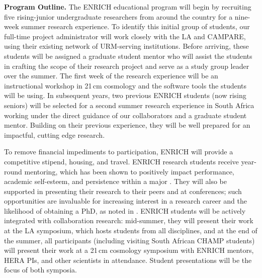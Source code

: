 \documentclass[preprint,11pt]{aastex}
\begin{document}
\textbf{Program Outline.} The ENRICH educational program will begin by recruiting five rising-junior undergraduate researchers from around the country for a nine-week summer research experience.  To identify this initial group of students, our full-time project administrator will work closely with the LA and CAMPARE, using their existing network of URM-serving institutions.  Before arriving, these students will be assigned a graduate student mentor who will assist the students in crafting the scope of their research project and serve as a study group leader over the summer.  The first week of the research experience will be an instructional workshop in 21\,cm cosmology and the software tools the students will be using.  In subsequent years, two previous ENRICH students (now rising seniors) will be selected for a second summer research experience in South Africa working under the direct guidance of our collaborators and a graduate student mentor.  Building on their previous experience,
they will be well prepared for an impactful, cutting edge research.

To remove financial impediments to participation, ENRICH will provide a competitive stipend, housing, and travel.  
ENRICH research students receive year-round mentoring, which has been shown to positively impact performance, academic self-esteem, and persistence within a major \citep{cross_and_vick_2001,armstrong_and_thompson_2003}. They will also be supported in presenting their research to their peers and at conferences; such opportunities are invaluable for increasing interest in a research career and the likelihood of obtaining a PhD, as noted in \cite{nsf_report_2006}.
ENRICH students will be actively integrated with collaboration research: mid-summer, they will present their work at the LA symposium, which hosts students from all disciplines, and  at the end of the summer, all participants (including visiting South African CHAMP students) will present their work at a 21\,cm cosmology symposium with ENRICH mentors, HERA PIs, and other scientists in attendance.  Student presentations will be the focus of both symposia.
\end{document}
